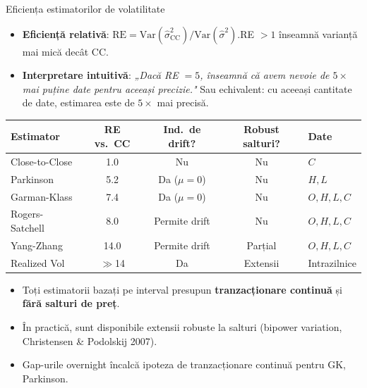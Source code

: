 \documentclass[9pt, aspectratio=169, t]{beamer}
\theoremstyle{definition}
\newcommand{\Var}{\text{Var}}
\begin{document}
\begin{frame}{Eficiența estimatorilor de volatilitate}
\begin{itemize}
    \item \textbf{Eficiență relativă}: $\text{RE} = \Var(\hat{\sigma}^2_{\text{CC}}) / \Var(\hat{\sigma}^2)$.\quad RE $> 1$ înseamnă varianță mai mică decât CC.
    \item \textbf{Interpretare intuitivă}: \textit{„Dacă RE $= 5$, înseamnă că avem nevoie de $5\times$ mai puține date pentru aceeași precizie."} Sau echivalent: cu aceeași cantitate de date, estimarea este de $5\times$ mai precisă.
\end{itemize}
\vspace{0.1cm}
\begin{center}
{\small
\renewcommand{\arraystretch}{1.25}
\begin{tabular}{lcccl}
\toprule
\textbf{Estimator} & \textbf{RE vs.\ CC} & \textbf{Ind.\ de drift?} & \textbf{Robust salturi?} & \textbf{Date} \\
\midrule
Close-to-Close & 1.0 & Nu & Nu & $C$ \\
Parkinson & 5.2 & Da ($\mu=0$) & Nu & $H,L$ \\
Garman-Klass & 7.4 & Da ($\mu=0$) & Nu & $O,H,L,C$ \\
Rogers-Satchell & 8.0 & \textcolor{Forest}{Permite drift} & Nu & $O,H,L,C$ \\
Yang-Zhang & 14.0 & \textcolor{Forest}{Permite drift} & Parțial & $O,H,L,C$ \\
Realized Vol & $\gg$14 & Da & Extensii & Intrazilnice \\
\bottomrule
\end{tabular}
}
\end{center}
\vspace{0.1cm}
\begin{itemize}
    \item Toți estimatorii bazați pe interval presupun \textbf{tranzacționare continuă} și \textbf{fără salturi de preț}.
    \item În practică, sunt disponibile extensii robuste la salturi (bipower variation, Christensen \& Podolskij 2007).
    \item Gap-urile overnight încalcă ipoteza de tranzacționare continuă pentru GK, Parkinson.
\end{itemize}
\end{frame}
\end{document}
